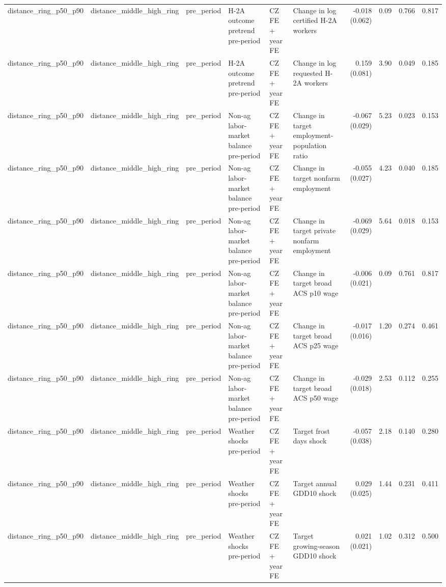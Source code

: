 \begin{tabular}{llllllrrrr}
distance_ring_p50_p90 & distance_middle_high_ring & pre_period & H-2A outcome pretrend pre-period & CZ FE + year FE & Change in log certified H-2A workers & -0.018 (0.062) & 0.09 & 0.766 & 0.817 \\
distance_ring_p50_p90 & distance_middle_high_ring & pre_period & H-2A outcome pretrend pre-period & CZ FE + year FE & Change in log requested H-2A workers & 0.159 (0.081) & 3.90 & 0.049 & 0.185 \\
distance_ring_p50_p90 & distance_middle_high_ring & pre_period & Non-ag labor-market balance pre-period & CZ FE + year FE & Change in target employment-population ratio & -0.067 (0.029) & 5.23 & 0.023 & 0.153 \\
distance_ring_p50_p90 & distance_middle_high_ring & pre_period & Non-ag labor-market balance pre-period & CZ FE + year FE & Change in target nonfarm employment & -0.055 (0.027) & 4.23 & 0.040 & 0.185 \\
distance_ring_p50_p90 & distance_middle_high_ring & pre_period & Non-ag labor-market balance pre-period & CZ FE + year FE & Change in target private nonfarm employment & -0.069 (0.029) & 5.64 & 0.018 & 0.153 \\
distance_ring_p50_p90 & distance_middle_high_ring & pre_period & Non-ag labor-market balance pre-period & CZ FE + year FE & Change in target broad ACS p10 wage & -0.006 (0.021) & 0.09 & 0.761 & 0.817 \\
distance_ring_p50_p90 & distance_middle_high_ring & pre_period & Non-ag labor-market balance pre-period & CZ FE + year FE & Change in target broad ACS p25 wage & -0.017 (0.016) & 1.20 & 0.274 & 0.461 \\
distance_ring_p50_p90 & distance_middle_high_ring & pre_period & Non-ag labor-market balance pre-period & CZ FE + year FE & Change in target broad ACS p50 wage & -0.029 (0.018) & 2.53 & 0.112 & 0.255 \\
distance_ring_p50_p90 & distance_middle_high_ring & pre_period & Weather shocks pre-period & CZ FE + year FE & Target frost days shock & -0.057 (0.038) & 2.18 & 0.140 & 0.280 \\
distance_ring_p50_p90 & distance_middle_high_ring & pre_period & Weather shocks pre-period & CZ FE + year FE & Target annual GDD10 shock & 0.029 (0.025) & 1.44 & 0.231 & 0.411 \\
distance_ring_p50_p90 & distance_middle_high_ring & pre_period & Weather shocks pre-period & CZ FE + year FE & Target growing-season GDD10 shock & 0.021 (0.021) & 1.02 & 0.312 & 0.500 \\

\end{tabular}
